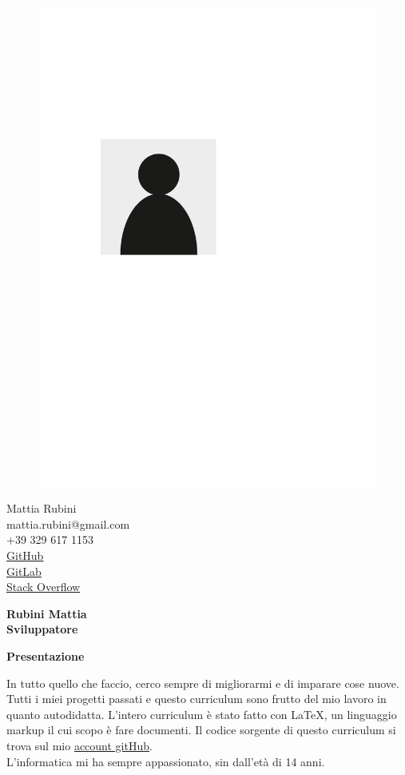 \documentclass[a4paper,12pt,final]{memoir}
\newcommand{\Sep}{\vspace{1.5em}}
\newcommand{\SmallSep}{\vspace{0.5em}}
\newcommand{\CVSection}[1]
	{\Large\textbf{#1}\par
	\SmallSep\normalsize\normalfont}
\begin{document}
\begin{figure}
	\hfill
	\includegraphics[width=0.6\columnwidth]{photo}
	\vspace{-7cm}
\end{figure}

\begin{flushright}\small
	Mattia Rubini \\
	mattia.rubini@gmail.com \\
	+39 329 617 1153 \\
	\href{https://github.com/Mot93}{GitHub}\\
	\href{https://gitlab.com/mattia.rubini}{GitLab}\\
	\href{https://stackoverflow.com/users/6875945/mattia-rubini}{Stack Overflow}
\end{flushright}\normalsize
\framebreak


\Huge\bfseries {\color{RoyalBlue} Rubini Mattia} \\
\Large\bfseries  Sviluppatore \\

\normalsize\normalfont

\CVSection{Presentazione}
	In tutto quello che faccio, cerco sempre di migliorarmi e di imparare cose nuove.
	Tutti i miei progetti passati e questo curriculum sono frutto del mio lavoro in quanto autodidatta.
	L'intero curriculum è stato fatto con \LaTeX, un linguaggio markup il cui scopo è fare documenti.
	Il codice sorgente di questo curriculum si trova sul mio \href{https://github.com/Mot93/CV-Mattia-Rubini}{account gitHub}.\\
	L'informatica mi ha sempre appassionato, sin dall'età di 14 anni.
\Sep
\end{document}
